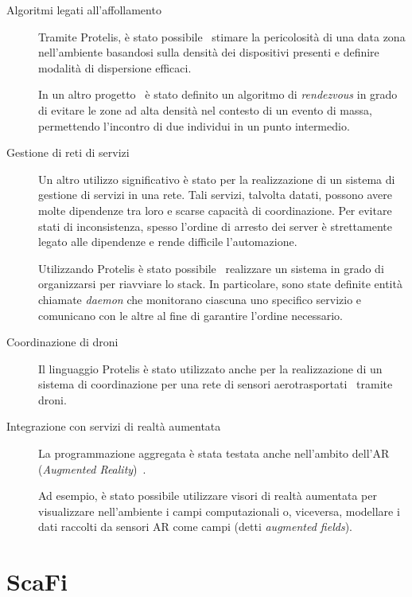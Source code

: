\begin{description}
  \item[Algoritmi legati all'affollamento]
    Tramite Protelis, è stato possibile~\cite{7274429} stimare la pericolosità di una data zona nell'ambiente basandosi sulla densità dei dispositivi presenti e definire modalità di dispersione efficaci.

    In un altro progetto~\cite{DBLP:journals/fgcs/CasadeiFPRSV19} è stato definito un algoritmo di \emph{rendezvous} in grado di evitare le zone ad alta densità nel contesto di un evento di massa, permettendo l'incontro di due individui in un punto intermedio.

  \item[Gestione di reti di servizi]
    Un altro utilizzo significativo è stato per la realizzazione di un sistema di gestione di servizi in una rete.
    Tali servizi, talvolta datati, possono avere molte dipendenze tra loro e scarse capacità di coordinazione.
    Per evitare stati di inconsistenza, spesso l'ordine di arresto dei server è strettamente legato alle dipendenze e rende difficile l'automazione.

    Utilizzando Protelis è stato possibile~\cite{7306601} realizzare un sistema in grado di organizzarsi per riavviare lo stack.
    In particolare, sono state definite entità chiamate \emph{daemon} che monitorano ciascuna uno specifico servizio e comunicano con le altre al fine di garantire l'ordine necessario.

  \item[Coordinazione di droni]
    Il linguaggio Protelis è stato utilizzato anche per la realizzazione di un sistema di coordinazione per una rete di sensori aerotrasportati~\cite{7536289,7789463} tramite droni.

  \item[Integrazione con servizi di realtà aumentata]
    La programmazione aggregata è stata testata anche nell'ambito dell'AR (\emph{Augmented Reality})~\cite{PCRV-SCOPES2015}.

    Ad esempio, è stato possibile utilizzare visori di realtà aumentata per visualizzare nell'ambiente i campi computazionali
    o, viceversa, modellare i dati raccolti da sensori AR come campi (detti \emph{augmented fields}).
\end{description}

\section{ScaFi}\label{sec:scafi}

